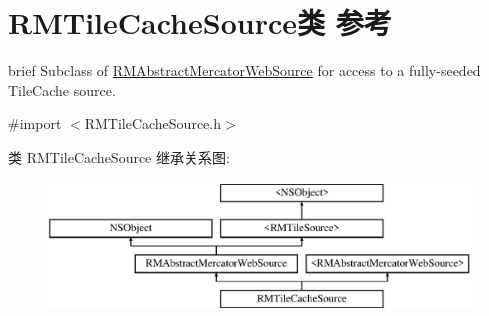 \hypertarget{interface_r_m_tile_cache_source}{\section{R\-M\-Tile\-Cache\-Source类 参考}
\label{interface_r_m_tile_cache_source}
}


brief Subclass of \hyperlink{interface_r_m_abstract_mercator_web_source}{R\-M\-Abstract\-Mercator\-Web\-Source} for access to a fully-\/seeded Tile\-Cache source.  




{\ttfamily \#import $<$R\-M\-Tile\-Cache\-Source.\-h$>$}

类 R\-M\-Tile\-Cache\-Source 继承关系图\-:\begin{figure}[H]
\begin{center}
\leavevmode
\includegraphics[height=3.425076cm]{interface_r_m_tile_cache_source}
\end{center}
\end{figure}
